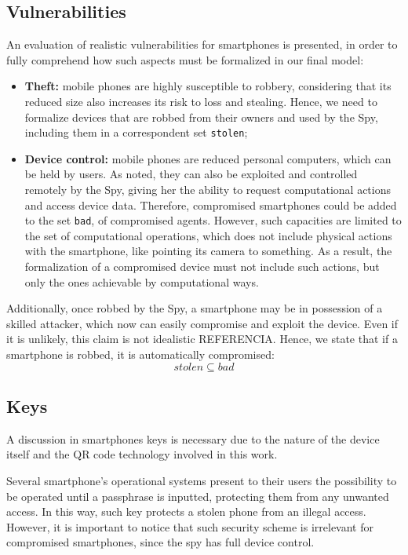 \subsection{Vulnerabilities}
An evaluation of realistic vulnerabilities for smartphones is presented, in order to fully comprehend how such aspects must be formalized in our final model:

\begin{itemize}
  \item \textbf{Theft:} mobile phones are highly susceptible to robbery, considering that its reduced size also increases its risk to loss and stealing. Hence, we need to formalize devices that are robbed from their owners and used by the Spy, including them in a correspondent set \texttt{stolen};

  \item \textbf{Device control:} mobile phones are reduced personal computers, which can be held by users. As noted, they can also be exploited and controlled remotely by the Spy, giving her the ability to request computational actions and access device data. Therefore, compromised smartphones could be added to the set \texttt{bad}, of compromised agents. However, such capacities are limited to the set of computational operations, which does not include physical actions with the smartphone, like pointing its camera to something. As a result, the formalization of a compromised device must not include such actions, but only the ones achievable by computational ways.
\end{itemize}

Additionally, once robbed by the Spy, a smartphone may be in possession of a skilled attacker, which now can easily compromise and exploit the device. Even if it is unlikely, this claim is not idealistic {\color{blue} REFERENCIA}. Hence, we state that if a smartphone is robbed, it is automatically compromised:
%
$$stolen \subseteq bad$$





\subsection{Keys}
A discussion in smartphones keys is necessary due to the nature of the device itself and the QR code technology involved in this work.

Several smartphone's operational systems present to their users the possibility to be operated until a passphrase is inputted, protecting them from any unwanted access. In this way, such key protects a stolen phone from an illegal access. However, it is important to notice that such security scheme is irrelevant for compromised smartphones, since the spy has full device control.



